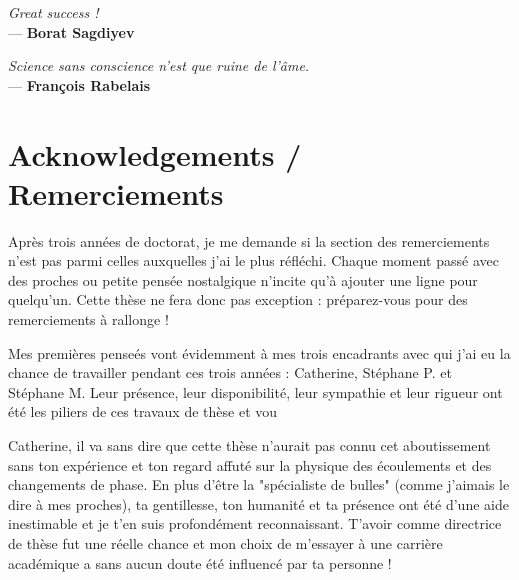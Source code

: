 

\begin{flushleft}{\slshape    
Great success !} \\ \medskip
--- \textbf{Borat Sagdiyev}
\end{flushleft}
\begin{flushright}{\slshape    
Science sans conscience n'est que ruine de l'âme.} \\ \medskip
--- \textbf{Fran\c{c}ois Rabelais}
\end{flushright}

\npar




\bigskip


\begingroup

\let\clearpage\relax
\let\cleardoublepage\relax
\let\cleardoublepage\relax

\chapter*{Acknowledgements / Remerciements}

Après trois années de doctorat, je me demande si la section des remerciements n'est pas parmi celles auxquelles j'ai le plus réfléchi. Chaque moment passé avec des proches ou petite pensée nostalgique n'incite qu'à ajouter une ligne pour quelqu'un. Cette thèse ne fera donc pas exception : préparez-vous pour des remerciements à rallonge ! 

\npar

Mes premières penseés vont évidemment à mes trois encadrants avec qui j'ai eu la chance de travailler pendant ces trois années : Catherine, Stéphane P. et Stéphane M. Leur présence, leur disponibilité, leur sympathie et leur rigueur ont été les piliers de ces travaux de thèse et vou

Catherine, il va sans dire que cette thèse n'aurait pas connu cet aboutissement sans ton expérience et ton regard affuté sur la physique des écoulements et des changements de phase. En plus d'être la "spécialiste de bulles" (comme j'aimais le dire à mes proches), ta gentillesse, ton humanité et ta présence ont été d'une aide inestimable et je t'en suis profondément reconnaissant. T'avoir comme directrice de thèse fut une réelle chance et mon choix de m'essayer à une carrière académique a sans aucun doute été influencé par ta personne ! 

